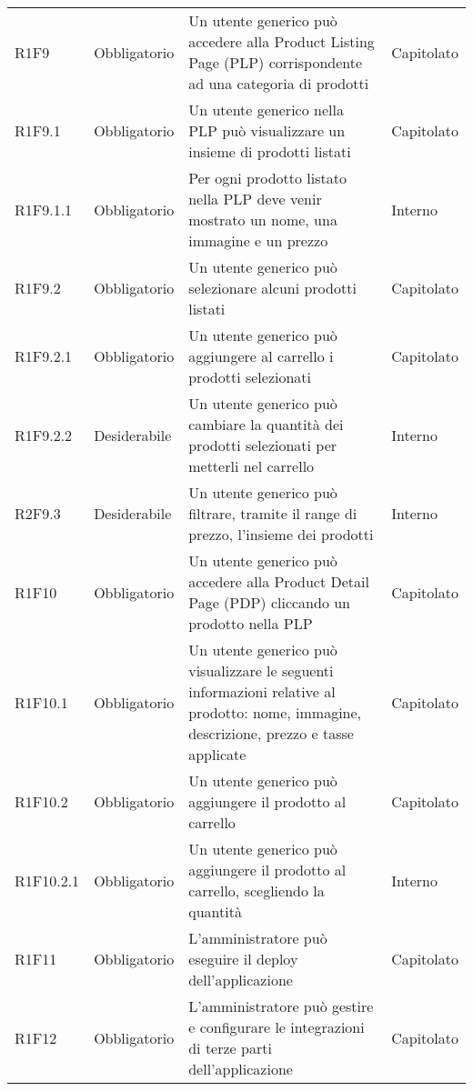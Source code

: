 {\begin{longtable}{C{2.5cm} C{2.8cm} C{6.7cm} C{2.5cm}}
R1F9 & Obbligatorio & Un utente generico può accedere alla Product Listing Page (PLP) corrispondente ad una categoria di prodotti & Capitolato \\
R1F9.1 & Obbligatorio & Un utente generico nella PLP può visualizzare un insieme di prodotti listati & Capitolato \\
R1F9.1.1 & Obbligatorio & Per ogni prodotto listato nella PLP deve venir mostrato un nome, una immagine e un prezzo & Interno \\
R1F9.2 & Obbligatorio & Un utente generico può selezionare alcuni prodotti listati & Capitolato \\
R1F9.2.1 & Obbligatorio & Un utente generico può aggiungere al carrello i prodotti selezionati & Capitolato \\
R1F9.2.2 & Desiderabile & Un utente generico può cambiare la quantità dei prodotti selezionati per metterli nel carrello & Interno \\
R2F9.3 & Desiderabile & Un utente generico può filtrare, tramite il range di prezzo, l'insieme dei prodotti & Interno \\


R1F10 & Obbligatorio & Un utente generico può accedere alla Product Detail Page (PDP) cliccando un prodotto nella PLP & Capitolato \\
R1F10.1 & Obbligatorio & Un utente generico può visualizzare le seguenti informazioni relative al prodotto: nome, immagine, descrizione, prezzo e tasse applicate & Capitolato \\
R1F10.2 & Obbligatorio & Un utente generico può aggiungere il prodotto al carrello & Capitolato \\
R1F10.2.1 & Obbligatorio & Un utente generico può aggiungere il prodotto al carrello, scegliendo la quantità & Interno \\


R1F11 & Obbligatorio & L'amministratore può eseguire il deploy dell'applicazione & Capitolato \\
R1F12 & Obbligatorio & L'amministratore può gestire e configurare le integrazioni di terze parti dell'applicazione & Capitolato \\

\end{longtable}

}